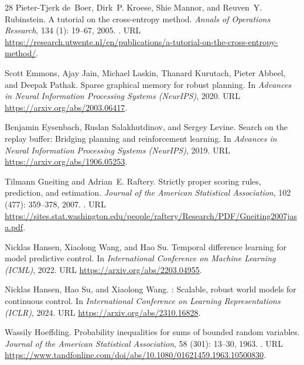 \documentclass{article}
\theoremstyle{definition}
\theoremstyle{remark}
\begin{document}
\begin{thebibliography}{28}
Pieter-Tjerk de~Boer, Dirk~P. Kroese, Shie Mannor, and Reuven~Y. Rubinstein.
\newblock A tutorial on the cross-entropy method.
\newblock \emph{Annals of Operations Research}, 134 (1):
  19--67, 2005.
\newblock {}.
\newblock URL
  \url{https://research.utwente.nl/en/publications/a-tutorial-on-the-cross-entropy-method/}.

Scott Emmons, Ajay Jain, Michael Laskin, Thanard Kurutach, Pieter Abbeel, and
  Deepak Pathak.
\newblock Sparse graphical memory for robust planning.
\newblock In \emph{Advances in Neural Information Processing Systems
  (NeurIPS)}, 2020.
\newblock URL \url{https://arxiv.org/abs/2003.06417}.

Benjamin Eysenbach, Ruslan Salakhutdinov, and Sergey Levine.
\newblock Search on the replay buffer: Bridging planning and reinforcement
  learning.
\newblock In \emph{Advances in Neural Information Processing Systems
  (NeurIPS)}, 2019.
\newblock URL \url{https://arxiv.org/abs/1906.05253}.

Tilmann Gneiting and Adrian~E. Raftery.
\newblock Strictly proper scoring rules, prediction, and estimation.
\newblock \emph{Journal of the American Statistical Association}, 102
  (477): 359--378, 2007.
\newblock {}.
\newblock URL
  \url{https://sites.stat.washington.edu/people/raftery/Research/PDF/Gneiting2007jasa.pdf}.

Nicklas Hansen, Xiaolong Wang, and Hao Su.
\newblock Temporal difference learning for model predictive control.
\newblock In \emph{International Conference on Machine Learning (ICML)}, 2022.
\newblock URL \url{https://arxiv.org/abs/2203.04955}.

Nicklas Hansen, Hao Su, and Xiaolong Wang.
: Scalable, robust world models for continuous control.
\newblock In \emph{International Conference on Learning Representations
  (ICLR)}, 2024.
\newblock URL \url{https://arxiv.org/abs/2310.16828}.

Wassily Hoeffding.
\newblock Probability inequalities for sums of bounded random variables.
\newblock \emph{Journal of the American Statistical Association}, 58
  (301): 13--30, 1963.
\newblock {}.
\newblock URL
  \url{https://www.tandfonline.com/doi/abs/10.1080/01621459.1963.10500830}.


\end{thebibliography}
\end{document}
